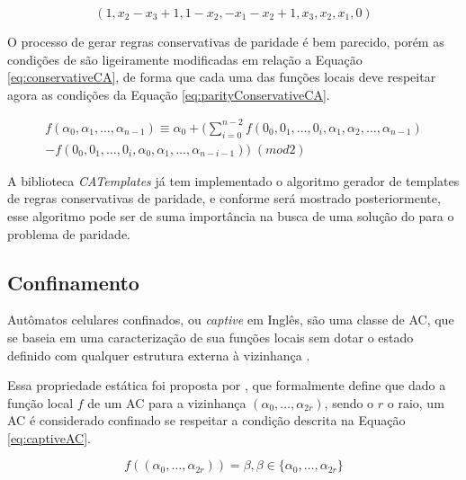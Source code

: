 \documentclass[12pt,a4paper]{article}
\begin{document}
	\begin{equation}
	(1,x_2-x_3+1,1-x_2,-x_1-x_2+1,x_3,x_2,x_1,0)
	\label{eq:conservativeTemplate}
	\end{equation}

	O processo de gerar regras conservativas de paridade é bem parecido, porém as condições de \cite{boccara2002} são ligeiramente modificadas em relação a Equação \ref{eq:conservativeCA}, de forma que cada uma das funções locais deve respeitar agora as condições da Equação \ref{eq:parityConservativeCA}.

	\begin{equation}
	\begin{split}
	f(\alpha_0,\alpha_1, \dots,\alpha_{n-1}) \equiv \alpha_0 + (\sum_{i=0}^{n-2}f(0_0,0_1, \dots,0_i,\alpha_1,\alpha_2, \dots,\alpha_{n-1}) \\- f(0_0,0_1, \dots,0_i,\alpha_0,\alpha_1, \dots,\alpha_{n-i-1})) \; (mod 2)  
	\label{eq:parityConservativeCA}
	\end{split}
	\end{equation}

	A biblioteca \textit{CATemplates} já tem implementado o algoritmo gerador de templates de regras conservativas de paridade, e conforme será mostrado posteriormente, esse algoritmo pode ser de suma importância na busca de uma solução do para o problema de paridade.





	\subsection{Confinamento}
	Autômatos celulares confinados, ou \textit{captive} em Inglês, são uma classe de AC, que se baseia em uma caracterização de sua funções locais sem dotar o estado definido com qualquer estrutura externa à vizinhança \cite{theyssier2004captive}. 

	Essa propriedade estática foi proposta por , que formalmente define que dado a função local $f$ de um AC para a vizinhança $(\alpha_0, \dots, \alpha_{2r})$, sendo o $r$ o raio, um AC é considerado confinado se respeitar a condição descrita na Equação \ref{eq:captiveAC}.

	\begin{equation}
	f((\alpha_0, \dots, \alpha_{2r})) = \beta, \beta \in \{\alpha_0, \dots, \alpha_{2r}\}
	\label{eq:captiveAC}
	\end{equation}
\end{document}
